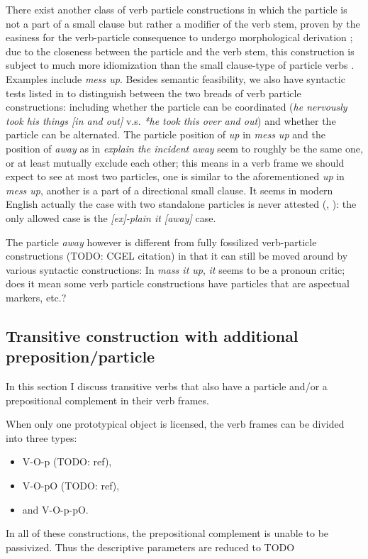 \documentclass[UTF8, a4paper, oneside, scheme=plain, 12pt]{ctexbook}
\newcommand*{\citepage}[1]{p.~{#1}}
\newcommand{\form}[1]{\emph{#1}}
\begin{document}
There exist another class of verb particle constructions in which 
the particle is not a part of a small clause
but rather a modifier of the verb stem,
proven by the easiness for the verb-particle consequence 
to undergo morphological derivation \citep{farrell2005english};
due to the closeness between the particle and the verb stem, 
this construction is subject to much more idiomization than 
the small clause-type of particle verbs
\citep{wurmbrand2000structure}.
Examples include \form{mess up}.
Besides semantic feasibility, 
we also have syntactic tests listed in \citet{wurmbrand2000structure} to distinguish 
between the two breads of verb particle constructions:
including whether the particle can be coordinated 
(\form{he nervously took his things [in and out]} 
v.s. \form{*he took this over and out})
and whether the particle can be alternated.
The particle position of \form{up} in \form{mess up} 
and the position of \form{away} as in \form{explain the incident away}
seem to roughly be the same one, 
or at least mutually exclude each other; 
this means in a verb frame we should expect to see at most two particles, 
one is similar to the aforementioned \form{up} in \form{mess up},
another is a part of a directional small clause.
It seems in modern English actually the case with two standalone particles 
is never attested (\citealt[\citepage{293}]{dixon2005semantic}, \citealt[\citepage{286}]{cgel}):  
the only allowed case is the \form{[ex]-plain it [away]} case.

The particle \form{away} however is different from fully fossilized verb-particle constructions 
(TODO: CGEL citation) in that it can still be moved around by various syntactic constructions:
In \form{mass it up}, \form{it} seems to be a pronoun critic;
does it mean some verb particle constructions have particles that are aspectual markers, etc.?

\subsection{Transitive construction with additional preposition/particle}


In this section I discuss 
transitive verbs that also have a particle and/or a prepositional complement 
in their verb frames.

When only one prototypical object is licensed,
the verb frames can be divided into three types:
\begin{itemize}
    \item V-O-p (TODO: ref),
    \item V-O-pO (TODO: ref), 
    \item and V-O-p-pO.
\end{itemize}
In all of these constructions, 
the prepositional complement is unable to be passivized.
Thus the descriptive parameters are reduced to TODO 
\end{document}
